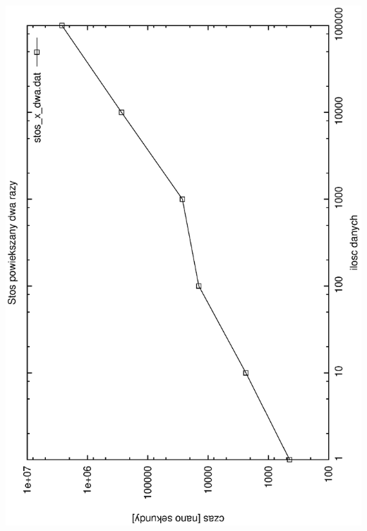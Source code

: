 \documentclass[a4paper,11pt]{report}
\begin{document}
    \includegraphics[scale=0.5, angle=270]{wykresy/stos_x_dwa.eps}
\end{document}
